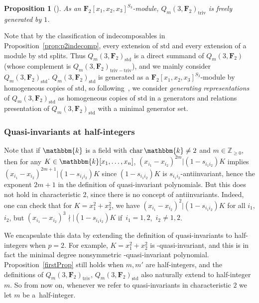 \documentclass[11pt]{article}
\numberwithin{equation}{section}
\newtheorem{Proposition}[Theorem]{Proposition}
\theoremstyle{definition}
\numberwithin{equation}{section}
\renewcommand{\k}{\mathbbm{k}}
\newcommand{\Z}{\mathbb{Z}}
\newcommand{\triv}{\mathrm{triv}}
\newcommand{\std}{\mathrm{std}}
\newcommand{\trtr}{\mathrm{triv-triv}}
\begin{document}
\begin{Proposition}[{\cite{wang2022explicit}}]\label{prop:p2triv}
 As an $\mathbf{F}_2[x_1,x_2,x_3]^{S_3}$-module, $Q_m(3,\mathbf{F}_2)_{\triv}$ is freely generated by $1$.
\end{Proposition}

Note that by the classification of indecomposables in Proposition~\ref{prop:p2indecomp}, every extension of $\std$ and every extension of a module by $\std$ splits. Thus $Q_m(3,\mathbf{F}_2)_\std$ is a direct summand of $Q_m(3,\mathbf{F}_2)$ (whose complement is $Q_m(3,\mathbf{F}_2)_\trtr$), and we mainly consider $Q_m(3,\mathbf{F}_2)_\std$. $Q_m(3,\mathbf{F}_2)_{\std}$ is generated as a $\mathbf{F}_2[x_1,x_2,x_3]^{S_3}$-module by homogeneous copies of $\std$, so following~\cite{wang2022explicit}, we consider \textit{generating representations} of $Q_m(3,\mathbf{F}_2)_\std$ as homogeneous copies of $\std$ in a generators and relations presentation of $Q_m(3,\mathbf{F}_2)_{\std}$ with a minimal generator set.

\subsubsection{Quasi-invariants at half-integers}

Note that if $\k$ is a field with $\mathrm{char\,}\k\neq 2$ and $m\in\Z_{\geq 0}$, then for any $K\in\k[x_1,\dots,x_n]$, $(x_{i_1}-x_{i_2})^{2m}|(1-s_{i_1i_2})K$ implies $(x_{i_1}-x_{i_2})^{2m+1}|(1-s_{i_1i_2})K$ since $(1-s_{i_1i_2})K$ is $s_{i_1i_2}$-antiinvariant, hence the exponent $2m+1$ in the definition of quasi-invariant polynomials. But this does not hold in characteristic 2, since there is no concept of antiinvariants. Indeed, one can check that for $K=x_1^2+x_2^2$, we have $(x_{i_1}-x_{i_2})^2|(1-s_{i_1i_2})K$ for all $i_1$, $i_2$, but $(x_{i_1}-x_{i_2})^3\nmid|(1-s_{i_1i_2})K$ if~$i_1=1,2$,~$i_2\neq 1,2$.

We encapsulate this data by extending the definition of quasi-invariants to half-integers when ${p=2}$. For example, $K=x_1^2+x_2^2$ is -quasi-invariant, and this is in fact the minimal degree nonsymmetric -quasi-invariant polynomial. Proposition~\ref{firstProp} still holds when $m,m'$ are half-integers, and the definitions of $Q_m(3,\mathbf{F}_2)_\triv$, $Q_m(3,\mathbf{F}_2)_\std$ also naturally extend to half-integer~$m$. So from now on, whenever we refer to quasi-invariants in characteristic $2$ we let $m$ be a~half-integer.
\end{document}
